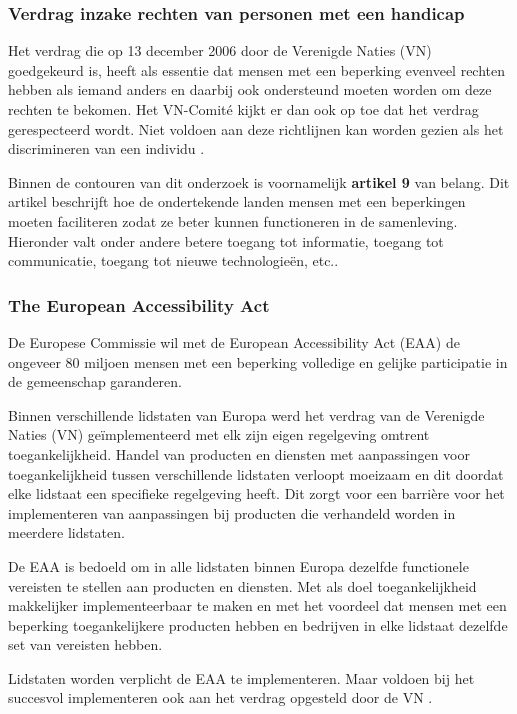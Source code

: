 \subsubsection{Verdrag inzake rechten van personen met een handicap}
\label{vn-Verdrag}
Het verdrag die op 13 december 2006 door de Verenigde Naties (VN) goedgekeurd is, heeft als essentie dat mensen met een beperking evenveel rechten hebben als iemand anders en daarbij ook ondersteund moeten worden om deze rechten te bekomen. Het VN-Comité kijkt er dan ook op toe dat het verdrag gerespecteerd wordt. Niet voldoen aan deze richtlijnen kan worden gezien als het discrimineren van een individu \autocite{unia2006}. 

Binnen de contouren van dit onderzoek is voornamelijk \textbf{artikel 9} van belang. Dit artikel beschrijft hoe de ondertekende landen mensen met een beperkingen moeten faciliteren zodat ze beter kunnen functioneren in de samenleving. Hieronder valt onder andere betere toegang tot informatie, toegang tot communicatie, toegang tot nieuwe technologieën, etc..  \autocite{un2006}

\subsubsection{The European Accessibility Act}
De Europese Commissie wil met de European Accessibility Act (EAA) de ongeveer 80
miljoen mensen met een beperking volledige en gelijke participatie in de gemeenschap
garanderen.


Binnen verschillende lidstaten van Europa werd het verdrag van de Verenigde Naties
(VN) geïmplementeerd met elk zijn eigen regelgeving omtrent toegankelijkheid. Handel
van producten en diensten met aanpassingen voor toegankelijkheid tussen verschillende
lidstaten verloopt moeizaam en dit doordat elke lidstaat een specifieke regelgeving heeft.
Dit zorgt voor een barrière voor het implementeren van aanpassingen bij producten die
verhandeld worden in meerdere lidstaten.


De EAA is bedoeld om in alle lidstaten binnen Europa dezelfde functionele vereisten te
stellen aan producten en diensten. Met als doel toegankelijkheid makkelijker implementeerbaar te maken en met het voordeel dat mensen met een
beperking toegankelijkere producten hebben en bedrijven in elke lidstaat dezelfde set van
vereisten hebben.


Lidstaten worden verplicht de EAA te implementeren. Maar voldoen bij het succesvol
implementeren ook aan het verdrag opgesteld door de VN
 \autocite{eaa2015}.



